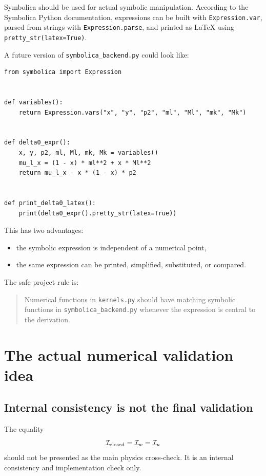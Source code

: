 \documentclass[11pt,a4paper]{article}
\begin{document}
Symbolica should be used for actual symbolic manipulation. According to the Symbolica Python documentation, expressions can be built with \texttt{Expression.var}, parsed from strings with \texttt{Expression.parse}, and printed as LaTeX using \texttt{pretty\_str(latex=True)}.

A future version of \texttt{symbolica\_backend.py} could look like:

\begin{lstlisting}
from symbolica import Expression


def variables():
    return Expression.vars("x", "y", "p2", "ml", "Ml", "mk", "Mk")


def delta0_expr():
    x, y, p2, ml, Ml, mk, Mk = variables()
    mu_l_x = (1 - x) * ml**2 + x * Ml**2
    return mu_l_x - x * (1 - x) * p2


def print_delta0_latex():
    print(delta0_expr().pretty_str(latex=True))
\end{lstlisting}

This has two advantages:
\begin{itemize}
  \item the symbolic expression is independent of a numerical point,
  \item the same expression can be printed, simplified, substituted, or compared.
\end{itemize}

The safe project rule is:
\begin{quote}
  Numerical functions in \texttt{kernels.py} should have matching symbolic functions in \texttt{symbolica\_backend.py} whenever the expression is central to the derivation.
\end{quote}

\section{The actual numerical validation idea}

\subsection{Internal consistency is not the final validation}

The equality
\begin{equation}
  \mathcal I_{\rm closed}=\mathcal I_w=\mathcal I_u
\end{equation}
should not be presented as the main physics cross-check. It is an internal consistency and implementation check only.
\end{document}

